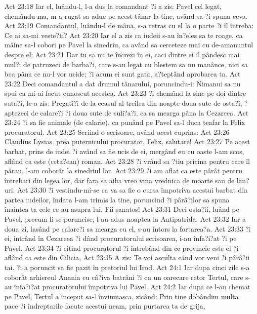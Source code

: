 Act 23:18  Iar el, luându-l, l-a dus la comandant ?i a zis: Pavel cel legat, chemându-ma, m-a rugat sa aduc pe acest tânar la tine, având sa-?i spuna ceva.
Act 23:19  Comandantul, luându-l de mâna, s-a retras cu el la o parte ?i îl întreba: Ce ai sa-mi veste?ti?
Act 23:20  Iar el a zis ca iudeii s-au în?eles sa te roage, ca mâine sa-l cobori pe Pavel la sinedriu, ca având sa cerceteze mai cu de-amanuntul despre el;
Act 23:21  Dar tu sa nu te încrezi în ei, caci dintre ei îl pândesc mai mul?i de patruzeci de barba?i, care s-au legat cu blestem sa nu manânce, nici sa bea pâna ce nu-l vor ucide; ?i acum ei sunt gata, a?teptând aprobarea ta.
Act 23:22  Deci comandantul a dat drumul tânarului, poruncindu-i: Nimanui sa nu spui ca mi-ai facut cunoscut acestea.
Act 23:23  ?i chemând la sine pe doi dintre suta?i, le-a zis: Pregati?i de la ceasul al treilea din noapte doua sute de osta?i, ?aptezeci de calare?i ?i doua sute de suli?a?i, ca sa mearga pâna la Cezareea.
Act 23:24  ?i sa fie animale (de calarie), ca punând pe Pavel sa-l duca teafar la Felix procuratorul.
Act 23:25  Scriind o scrisoare, având acest cuprins:
Act 23:26  Claudius Lysias, prea puternicului procurator, Felix, salutare!
Act 23:27  Pe acest barbat, prins de iudei ?i având sa fie ucis de ei, mergând eu cu oaste l-am scos, aflând ca este (ceta?ean) roman.
Act 23:28  ?i vrând sa ?tiu pricina pentru care îl pârau, l-am coborât la sinedriul lor.
Act 23:29  ?i am aflat ca este pârât pentru întrebari din legea lor, dar fara sa aiba vreo vina vrednica de moarte sau de lan?uri.
Act 23:30  ?i vestindu-mi-se ca va sa fie o cursa împotriva acestui barbat din partea iudeilor, îndata l-am trimis la tine, poruncind ?i pârâ?ilor sa spuna înaintea ta cele ce au asupra lui. Fii sanatos!
Act 23:31  Deci osta?ii, luând pe Pavel, precum li se poruncise, l-au adus noaptea la Antipatrida.
Act 23:32  Iar a doua zi, lasând pe calare?i sa mearga cu el, s-au întors la fortarea?a.
Act 23:33  ?i ei, intrând în Cezareea ?i dând procuratorului scrisoarea, i-au înfa?i?at ?i pe Pavel.
Act 23:34  ?i citind procuratorul ?i întrebând din ce provincie este el ?i aflând ca este din Cilicia,
Act 23:35  A zis: Te voi asculta când vor veni ?i pârâ?ii tai. ?i a poruncit sa fie pazit în pretoriul lui Irod.
Act 24:1  Iar dupa cinci zile s-a coborât arhiereul Anania cu câ?iva batrâni ?i cu un oarecare retor Tertul, care s-au înfa?i?at procuratorului împotriva lui Pavel.
Act 24:2  Iar dupa ce l-au chemat pe Pavel, Tertul a început sa-l învinuiasca, zicând: Prin tine dobândim multa pace ?i îndreptarile facute acestui neam, prin purtarea ta de grija,
